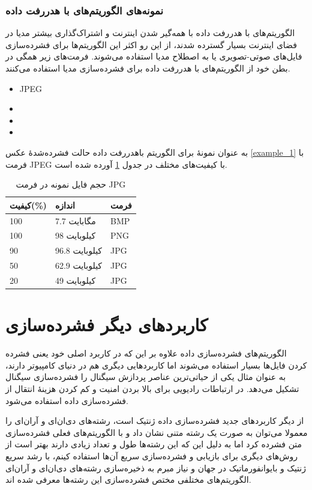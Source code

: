 \subsubsection{نمونه‌های الگوریتم‌های با هدررفت داده}
الگوریتم‌های با هدررفت داده با همه‌گیر شدن اینترنت و اشتراک‌گذاری 
بیشتر مدیا در فضای اینترنت بسیار گسترده شدند، از این رو اکثر این الگوریتم‌ها برای فشرده‌سازی فایل‌های صوتی-تصویری یا به اصطلاح 
مدیا  
استفاده می‌شوند. فرمت‌های زیر همگی در بطن خود از الگوریتم‌های با هدررفت داده برای فشرده‌سازی مدیا استفاده می‌کنند.

\begin{itemize}
	\item JPEG
	\item {}
	\item {}
	\item {}
\end{itemize}
به عنوان نمونهٔ برای الگوریتم باهدررفت داده 
حالت فشرده‌شدهٔ عکس 
\ref{example_1}
با فرمت JPEG 
با کیفیت‌های مختلف در جدول 
\ref{compare_2}
آورده شده است.

\begin{table}[h]
	\centering
	\caption{حجم فایل نمونه در فرمت JPG}
	\label{compare_2}
	\begin{tabular}{@{}lll@{}}
	\toprule
	کیفیت(\%) & اندازه & فرمت \\ \midrule
	100 & 7.7 مگابایت & BMP \\
	100 & 98 کیلوبایت & PNG \\
	90 & 96.8 کیلوبایت & JPG \\
	50 & 62.9 کیلوبایت & JPG \\
	20 & 49  کیلوبایت& JPG \\ \bottomrule
	\end{tabular}
	\end{table}


\section{کاربردهای دیگر فشرده‌سازی}
الگوریتم‌های فشرده‌سازی داده علاوه بر این که در کاربرد اصلی خود یعنی فشرده کردن فایل‌ها بسیار استفاده می‌شوند اما کاربردهایی دیگری هم در دنیای
کامپیوتر دارند، به عنوان مثال یکی از حیاتی‌ترین عناصر پردازش سیگنال 
را فشرده‌سازی سیگنال تشکیل می‌دهد. در ارتباطات رادیویی برای بالا بردن امنیت و کم کردن هزینهٔ انتقال از فشرده‌سازی داده استفاده می‌شود. 

از دیگر کاربردهای جدید فشرده‌سازی داده ژنتیک است، رشته‌های دی‌ان‌ای
و آر‌ان‌ای
 را معمولا می‌توان به صورت
یک رشته متنی نشان داد و با الگوریتم‌های فعلی فشرده‌سازی متن فشرده کرد اما به دلیل این که این رشته‌ها طول و تعداد زیادی دارند
بهتر است از روش‌های دیگری برای بازیابی و فشرده‌سازی سریع آن‌ها استفاده کینم، با رشد سریع ژنتیک و بایوانفورماتیک در جهان و نیاز
مبرم به ذخیره‌سازی رشته‌های دی‌ان‌ای و آران‌ای 
الگوریتم‌های مختلفی مختص فشرده‌سازی این رشته‌ها معرفی شده اند\cite{dna}. 